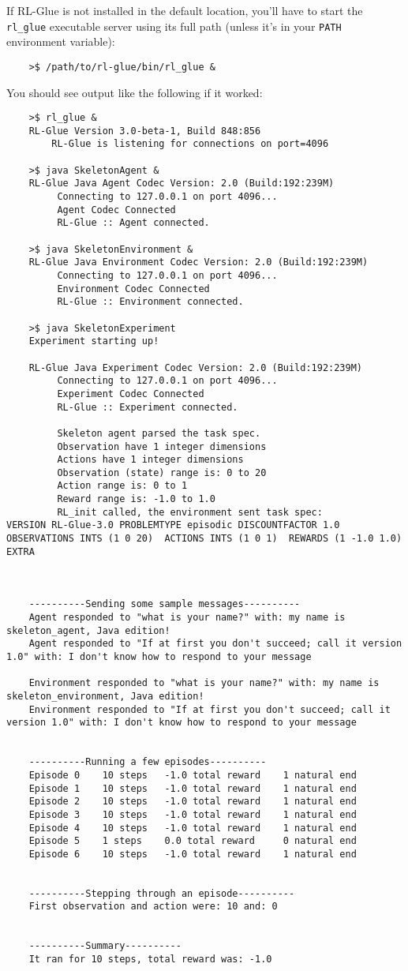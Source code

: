 \documentclass[11pt]{article}
\begin{document}
If RL-Glue is not installed in the default location, you'll have to start the \texttt{rl\_glue} executable server using its full path (unless it's in your \texttt{PATH} environment variable):
\begin{verbatim}
	>$ /path/to/rl-glue/bin/rl_glue &
\end{verbatim}

You should see output like the following if it worked:
\begin{verbatim}
	>$ rl_glue & 
	RL-Glue Version 3.0-beta-1, Build 848:856
     	RL-Glue is listening for connections on port=4096

	>$ java SkeletonAgent &
	RL-Glue Java Agent Codec Version: 2.0 (Build:192:239M)
	     Connecting to 127.0.0.1 on port 4096...
	     Agent Codec Connected
	     RL-Glue :: Agent connected.
	
	>$ java SkeletonEnvironment &
	RL-Glue Java Environment Codec Version: 2.0 (Build:192:239M)
	     Connecting to 127.0.0.1 on port 4096...
	     Environment Codec Connected
	     RL-Glue :: Environment connected.

	>$ java SkeletonExperiment
	Experiment starting up!

	RL-Glue Java Experiment Codec Version: 2.0 (Build:192:239M)
	     Connecting to 127.0.0.1 on port 4096...
	     Experiment Codec Connected
	     RL-Glue :: Experiment connected.

	     Skeleton agent parsed the task spec.
	     Observation have 1 integer dimensions
	     Actions have 1 integer dimensions
	     Observation (state) range is: 0 to 20
	     Action range is: 0 to 1
	     Reward range is: -1.0 to 1.0
	     RL_init called, the environment sent task spec:
VERSION RL-Glue-3.0 PROBLEMTYPE episodic DISCOUNTFACTOR 1.0 
OBSERVATIONS INTS (1 0 20)  ACTIONS INTS (1 0 1)  REWARDS (1 -1.0 1.0)  EXTRA 



	----------Sending some sample messages----------
	Agent responded to "what is your name?" with: my name is skeleton_agent, Java edition!
	Agent responded to "If at first you don't succeed; call it version 1.0" with: I don't know how to respond to your message

	Environment responded to "what is your name?" with: my name is skeleton_environment, Java edition!
	Environment responded to "If at first you don't succeed; call it version 1.0" with: I don't know how to respond to your message


	----------Running a few episodes----------
	Episode 0	 10 steps 	-1.0 total reward	 1 natural end
	Episode 1	 10 steps 	-1.0 total reward	 1 natural end
	Episode 2	 10 steps 	-1.0 total reward	 1 natural end
	Episode 3	 10 steps 	-1.0 total reward	 1 natural end
	Episode 4	 10 steps 	-1.0 total reward	 1 natural end
	Episode 5	 1 steps 	0.0 total reward	 0 natural end
	Episode 6	 10 steps 	-1.0 total reward	 1 natural end


	----------Stepping through an episode----------
	First observation and action were: 10 and: 0


	----------Summary----------
	It ran for 10 steps, total reward was: -1.0

\end{verbatim}
\end{document}
